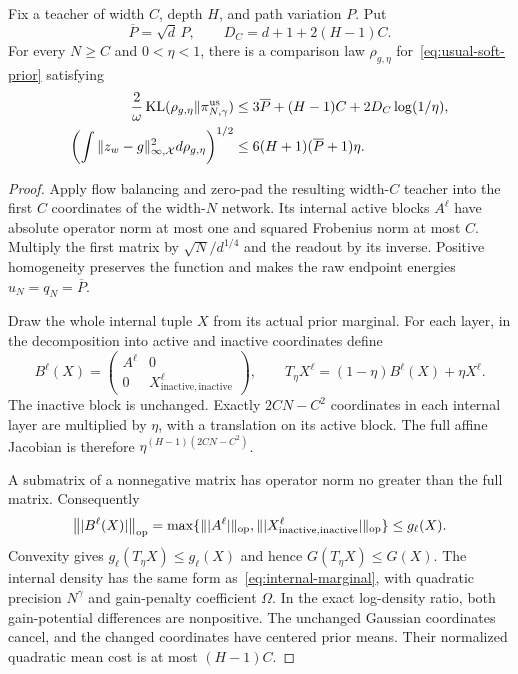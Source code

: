 \begin{lemma}
\label{lem:selective-block}
Fix a teacher of width $C$, depth $H$, and path variation $P$. Put
\[
 \overline P=\sqrt d\,P,\qquad
 D_C=d+1+2(H-1)C.
\]
For every $N\ge C$ and $0<\eta<1$, there is a comparison law $\rho_{g,\eta}$ for~\eqref{eq:usual-soft-prior} satisfying
\begin{align}
 \frac2\omega\operatorname{KL}(\rho_{g,\eta}\|\pi^{\mathrm{us}}_{N,\gamma})
 &\le3\overline P+(H-1)C+2D_C\log(1/\eta),
 \label{eq:usual-entropy}\\
 \left(\int\|z_w-g\|_{\infty,\mathcal X}^2d\rho_{g,\eta}\right)^{1/2}
 &\le6(H+1)(\overline P+1)\eta.
 \label{eq:usual-tube}
\end{align}
\end{lemma}
\begin{proof}
Apply flow balancing and zero-pad the resulting width-$C$ teacher into the first $C$ coordinates of the width-$N$ network. Its internal active blocks $A^\ell$ have absolute operator norm at most one and squared Frobenius norm at most $C$. Multiply the first matrix by $\sqrt N/d^{1/4}$ and the readout by its inverse. Positive homogeneity preserves the function and makes the raw endpoint energies
$u_N=q_N=\overline P$.

Draw the whole internal tuple $X$ from its actual prior marginal. For each layer, in the decomposition into active and inactive coordinates define
\[
 B^\ell(X)=
 \begin{pmatrix} A^\ell&0\\0&X^\ell_{\mathrm{inactive,inactive}}\end{pmatrix},
 \qquad T_\eta X^\ell=(1-\eta)B^\ell(X)+\eta X^\ell.
\]
The inactive block is unchanged. Exactly $2CN-C^2$ coordinates in each internal layer are multiplied by $\eta$, with a translation on its active block. The full affine Jacobian is therefore
$\eta^{(H-1)(2CN-C^2)}$.

A submatrix of a nonnegative matrix has operator norm no greater than the full matrix. Consequently
\[
 \bigl\||B^\ell(X)|\bigr\|_{\mathrm{op}}
 =\max\{\||A^\ell|\|_{\mathrm{op}},
          \||X^\ell_{\mathrm{inactive,inactive}}|\|_{\mathrm{op}}\}
 \le g_\ell(X).
\]
Convexity gives $g_\ell(T_\eta X)\le g_\ell(X)$ and hence $G(T_\eta X)\le G(X)$. The internal density has the same form as~\eqref{eq:internal-marginal}, with quadratic precision $N^\gamma$ and gain-penalty coefficient $\Omega$. In the exact log-density ratio, both gain-potential differences are nonpositive. The unchanged Gaussian coordinates cancel, and the changed coordinates have centered prior means. Their normalized quadratic mean cost is at most $(H-1)C$.


\end{proof}
